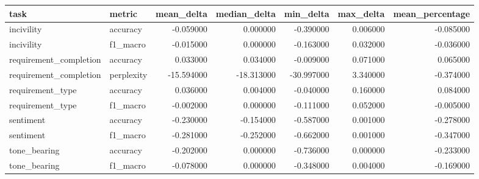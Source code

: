 \begin{tabular}{llrrrrr}
\toprule
task & metric & mean_delta & median_delta & min_delta & max_delta & mean_percentage \\
\midrule
incivility & accuracy & -0.059000 & 0.000000 & -0.390000 & 0.006000 & -0.085000 \\
incivility & f1_macro & -0.015000 & 0.000000 & -0.163000 & 0.032000 & -0.036000 \\
requirement_completion & accuracy & 0.033000 & 0.034000 & -0.009000 & 0.071000 & 0.065000 \\
requirement_completion & perplexity & -15.594000 & -18.313000 & -30.997000 & 3.340000 & -0.374000 \\
requirement_type & accuracy & 0.036000 & 0.004000 & -0.040000 & 0.160000 & 0.084000 \\
requirement_type & f1_macro & -0.002000 & 0.000000 & -0.111000 & 0.052000 & -0.005000 \\
sentiment & accuracy & -0.230000 & -0.154000 & -0.587000 & 0.001000 & -0.278000 \\
sentiment & f1_macro & -0.281000 & -0.252000 & -0.662000 & 0.001000 & -0.347000 \\
tone_bearing & accuracy & -0.202000 & 0.000000 & -0.736000 & 0.000000 & -0.233000 \\
tone_bearing & f1_macro & -0.078000 & 0.000000 & -0.348000 & 0.004000 & -0.169000 \\
\bottomrule
\end{tabular}
